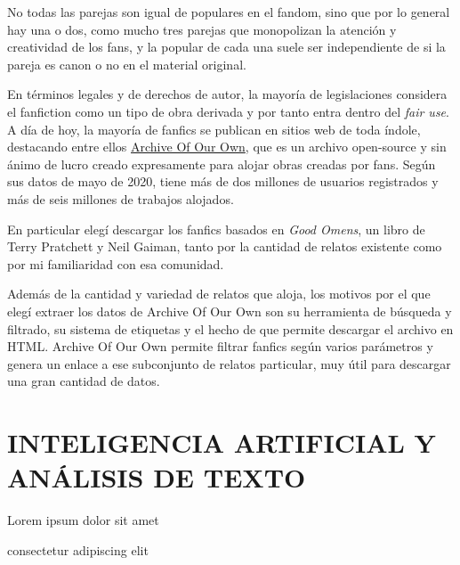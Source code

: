 \documentclass{pre-tfg}
\begin{document}

No todas las parejas son igual de populares en el fandom, sino que por lo general hay una o dos, como mucho tres parejas que monopolizan la atención y creatividad de los fans, y la popular de cada una suele ser independiente de si la pareja es canon o no en el material original.

En términos legales y de derechos de autor, la mayoría de legislaciones considera el fanfiction como un tipo de obra derivada \cite{woosh_1998} y por tanto entra dentro del \textit{fair use}. A día de hoy, la mayoría de fanfics se publican en sitios web de toda índole, destacando entre ellos \href{archiveofourown.org}{Archive Of Our Own}, que es un archivo open-source y sin ánimo de lucro creado expresamente para alojar obras creadas por fans. Según sus datos de mayo de 2020, tiene más de dos millones de usuarios registrados y más de seis millones de trabajos alojados. 


En particular elegí descargar los fanfics basados en \textit{Good Omens}, un libro de Terry Pratchett y Neil Gaiman, tanto por la cantidad de relatos existente como por mi familiaridad con esa comunidad.

Además de la cantidad y variedad de relatos que aloja, los motivos por el que elegí extraer los datos de  Archive Of Our Own son su herramienta de búsqueda y filtrado, su sistema de etiquetas y el hecho de que permite descargar el archivo en HTML. Archive Of Our Own permite filtrar fanfics según varios parámetros y genera un enlace a ese subconjunto de relatos particular, muy útil para descargar una gran cantidad de datos.

\section{INTELIGENCIA ARTIFICIAL Y ANÁLISIS DE TEXTO}
Lorem ipsum dolor sit amet 

consectetur adipiscing elit 

\end{document}
